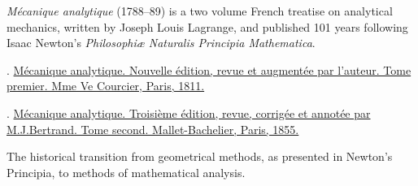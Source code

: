 

\label{section:virtualworkprinciple.classicalmechanics}

\emph{Mécanique analytique} (1788--89) is a two volume French treatise on analytical mechanics, written by Joseph Louis Lagrange, and published 101 years following Isaac Newton’s \emph{Philosophiæ Naturalis Principia Mathematica}.

.
\href{https://play.google.com/books/reader?id=Q8MKAAAAYAAJ&pg=GBS.PP7}{Mécanique analytique. Nouvelle édition, revue et augmentée par l’auteur. Tome premier. Mme Ve Courcier, Paris, 1811.} 

.
\href{https://play.google.com/books/reader?id=TmMSAAAAIAAJ&pg=GBS.PP9}{Mécanique analytique. Troisième édition, revue, corrigée et annotée par M.\:J.\:Bertrand. Tome second. Mallet-Bachelier, Paris, 1855.} 

The historical transition from geometrical methods, as presented in Newton’s Principia, to methods of mathematical analysis.

